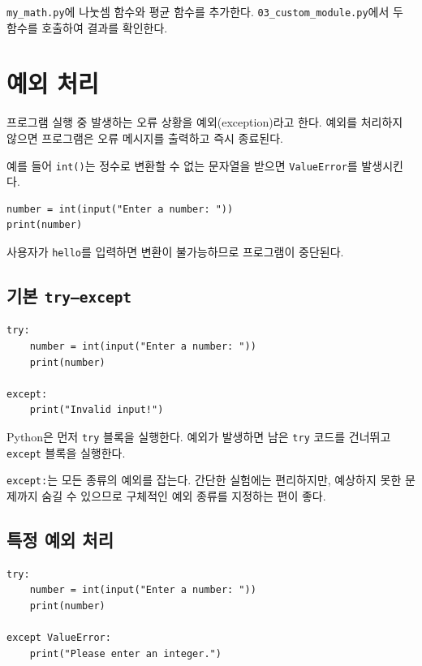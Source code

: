 \documentclass[11pt,a4paper]{article}
\begin{document}
\begin{practicebox}
\texttt{my\_math.py}에 나눗셈 함수와 평균 함수를 추가한다. \texttt{03\_custom\_module.py}에서 두 함수를 호출하여 결과를 확인한다.
\end{practicebox}

\section{예외 처리}

프로그램 실행 중 발생하는 오류 상황을 예외(exception)라고 한다. 예외를 처리하지 않으면 프로그램은 오류 메시지를 출력하고 즉시 종료된다.

예를 들어 \texttt{int()}는 정수로 변환할 수 없는 문자열을 받으면 \texttt{ValueError}를 발생시킨다.

\begin{lstlisting}
number = int(input("Enter a number: "))
print(number)
\end{lstlisting}

사용자가 \texttt{hello}를 입력하면 변환이 불가능하므로 프로그램이 중단된다.

\subsection{기본 \texttt{try--except}}

\begin{lstlisting}
try:
    number = int(input("Enter a number: "))
    print(number)

except:
    print("Invalid input!")
\end{lstlisting}

Python은 먼저 \texttt{try} 블록을 실행한다. 예외가 발생하면 남은 \texttt{try} 코드를 건너뛰고 \texttt{except} 블록을 실행한다.

\begin{importantbox}
\texttt{except:}는 모든 종류의 예외를 잡는다. 간단한 실험에는 편리하지만, 예상하지 못한 문제까지 숨길 수 있으므로 구체적인 예외 종류를 지정하는 편이 좋다.
\end{importantbox}

\subsection{특정 예외 처리}

\begin{lstlisting}
try:
    number = int(input("Enter a number: "))
    print(number)

except ValueError:
    print("Please enter an integer.")
\end{lstlisting}
\end{document}
